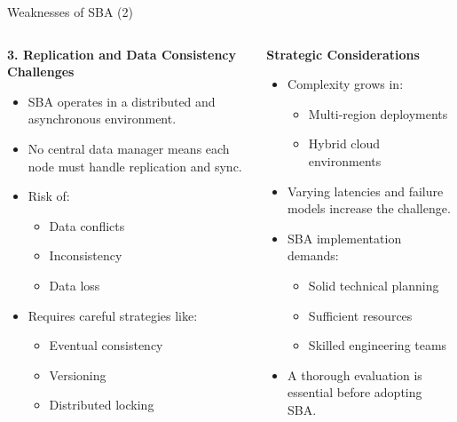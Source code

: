 \documentclass[aspectratio=169, table]{beamer}
\begin{document}
	\begin{frame}{Weaknesses of SBA (2)}
		\vspace{15pt}
		\begin{columns}[t]
			\begin{column}{0.55\textwidth}
				\textbf{3. Replication and Data Consistency Challenges}
				\begin{itemize}
					\item SBA operates in a distributed and asynchronous environment.
					\item No central data manager means each node must handle replication and sync.
					\item Risk of:
					\begin{itemize}
						\item Data conflicts
						\item Inconsistency
						\item Data loss
					\end{itemize}
					\item Requires careful strategies like:
					\begin{itemize}
						\item Eventual consistency
						\item Versioning
						\item Distributed locking
					\end{itemize}
				\end{itemize}
			\end{column}
			
			\begin{column}{0.45\textwidth}
				\textbf{Strategic Considerations}
				\begin{itemize}
					\item Complexity grows in:
					\begin{itemize}
						\item Multi-region deployments
						\item Hybrid cloud environments
					\end{itemize}
					\item Varying latencies and failure models increase the challenge.
					\item SBA implementation demands:
					\begin{itemize}
						\item Solid technical planning
						\item Sufficient resources
						\item Skilled engineering teams
					\end{itemize}
					\item A thorough evaluation is essential before adopting SBA.
				\end{itemize}
			\end{column}
		\end{columns}
	\end{frame}
	
\end{document}
